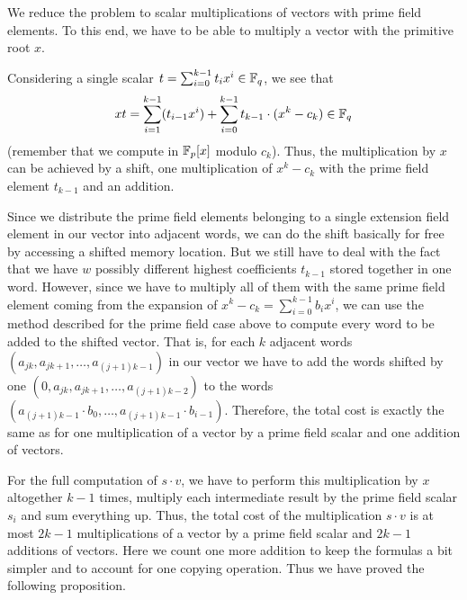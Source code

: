 We reduce the problem to scalar multiplications of vectors with
prime field elements. To this end, we have to be able to multiply
a vector with the primitive root $x$.

Considering a single scalar $t = \sum_{i=0}^{k-1} t_i x^i \in \mathbb{F}_q$, 
we see that 
\[ xt = \sum_{i=1}^{k-1} (t_{i-1}x^i) 
+ \sum_{i=0}^{k-1} t_{k-1} \cdot (x^k - c_k) \in \mathbb{F}_q \] 
(remember that we compute in $\mathbb{F}_p[x]$ modulo $c_k$).
Thus, the multiplication by $x$ can be achieved by a shift, one
multiplication of $x^k - c_k$ with the prime field element $t_{k-1}$
and an addition.

Since we distribute the prime field elements belonging to a single
extension field element in our vector into adjacent words, we can 
do the shift basically for free by accessing a shifted memory location.
But we still have to deal with the fact that we have $w$ possibly different
highest coefficients $t_{k-1}$ stored together in one word. However,
since we have to multiply all of them with the same prime field element
coming from the expansion of $x^k - c_k = \sum_{i=0}^{k-1} b_i x^i$,
we can use the method described
for the prime field case above to compute every word to be added to the
shifted vector. That is, for each $k$ adjacent words 
$(a_{jk},a_{jk+1},\ldots,a_{(j+1)k-1})$ in our vector we have to
add the words shifted by one $(0,a_{jk},a_{jk+1},\ldots,a_{(j+1)k-2})$
to the words $(a_{(j+1)k-1} \cdot b_0, \ldots, a_{(j+1)k-1} \cdot b_{i-1})$.
Therefore, the total cost is exactly the same as for one multiplication of
a vector by a prime field scalar and one addition of vectors.

For the full computation of $s \cdot v$, we have to perform this multiplication
by $x$ altogether $k-1$ times, multiply each intermediate result by the
prime field scalar $s_i$ and sum everything up. Thus, the total cost
of the multiplication $s \cdot v$ is at most $2k-1$ multiplications
of a vector by a prime field scalar and $2k-1$ additions of vectors.
Here we count one more addition to keep the formulas a bit simpler
and to account for one copying operation.
Thus we have proved the following proposition.

